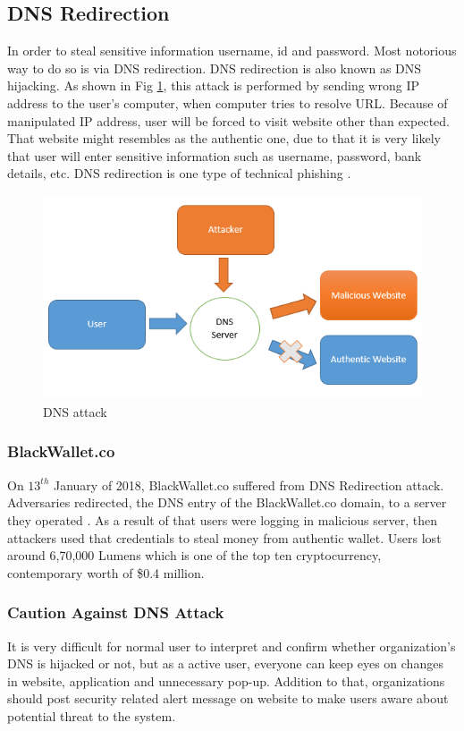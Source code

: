 \documentclass[a4paper,twoside,12pt]{report}
\begin{document}
\begin{spacing}{1.5}
\subsection{DNS Redirection}
In order to steal sensitive information username, id and password. Most notorious way to do so is via DNS redirection. DNS redirection is also known as DNS hijacking. As shown in Fig \ref{img: dns}, this attack is performed by sending wrong IP address to the user's computer, when computer tries to resolve URL. Because of manipulated IP address, user will be forced to visit website other than expected. That website might resembles as the authentic one, due to that it is very likely that user will enter sensitive information such as 
username, password, bank details, etc. DNS redirection is one type of technical phishing \cite{andryukhinphishing}.
\begin{figure}[h!]
\begin{center}
  \includegraphics[width=0.8\linewidth]{images/dns.png}
  \caption{DNS attack}
  \label{img: dns}
\end{center}
\end{figure}
\subsubsection{BlackWallet.co}
On $13^{th}$ January of 2018, BlackWallet.co suffered from DNS Redirection attack. Adversaries redirected, the DNS entry of the BlackWallet.co domain, to a server they operated \cite{blackwallet_nodate}. As a result of that users were logging in malicious server, then attackers used that credentials to steal money from authentic wallet. Users lost around 6,70,000 Lumens which is one of the top ten cryptocurrency, contemporary worth of \$0.4 million. 
\subsubsection{Caution Against DNS Attack}
It is very difficult for normal user to interpret and confirm whether organization's DNS is hijacked or not, but as a active user, everyone can keep eyes on changes in website, application and unnecessary pop-up. Addition to that, organizations should post security related alert message on website to make users aware about potential threat to the system.

\end{spacing}
\end{document}
